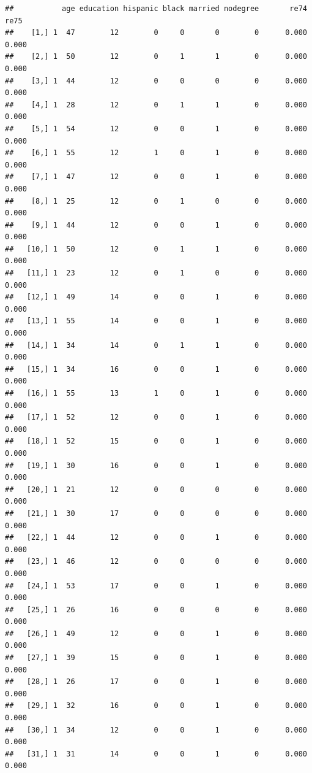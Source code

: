 \documentclass[
]{article}
\begin{document}
\begin{verbatim}
##           age education hispanic black married nodegree       re74       re75
##    [1,] 1  47        12        0     0       0        0      0.000      0.000
##    [2,] 1  50        12        0     1       1        0      0.000      0.000
##    [3,] 1  44        12        0     0       0        0      0.000      0.000
##    [4,] 1  28        12        0     1       1        0      0.000      0.000
##    [5,] 1  54        12        0     0       1        0      0.000      0.000
##    [6,] 1  55        12        1     0       1        0      0.000      0.000
##    [7,] 1  47        12        0     0       1        0      0.000      0.000
##    [8,] 1  25        12        0     1       0        0      0.000      0.000
##    [9,] 1  44        12        0     0       1        0      0.000      0.000
##   [10,] 1  50        12        0     1       1        0      0.000      0.000
##   [11,] 1  23        12        0     1       0        0      0.000      0.000
##   [12,] 1  49        14        0     0       1        0      0.000      0.000
##   [13,] 1  55        14        0     0       1        0      0.000      0.000
##   [14,] 1  34        14        0     1       1        0      0.000      0.000
##   [15,] 1  34        16        0     0       1        0      0.000      0.000
##   [16,] 1  55        13        1     0       1        0      0.000      0.000
##   [17,] 1  52        12        0     0       1        0      0.000      0.000
##   [18,] 1  52        15        0     0       1        0      0.000      0.000
##   [19,] 1  30        16        0     0       1        0      0.000      0.000
##   [20,] 1  21        12        0     0       0        0      0.000      0.000
##   [21,] 1  30        17        0     0       0        0      0.000      0.000
##   [22,] 1  44        12        0     0       1        0      0.000      0.000
##   [23,] 1  46        12        0     0       0        0      0.000      0.000
##   [24,] 1  53        17        0     0       1        0      0.000      0.000
##   [25,] 1  26        16        0     0       0        0      0.000      0.000
##   [26,] 1  49        12        0     0       1        0      0.000      0.000
##   [27,] 1  39        15        0     0       1        0      0.000      0.000
##   [28,] 1  26        17        0     0       1        0      0.000      0.000
##   [29,] 1  32        16        0     0       1        0      0.000      0.000
##   [30,] 1  34        12        0     0       1        0      0.000      0.000
##   [31,] 1  31        14        0     0       1        0      0.000      0.000

\end{verbatim}
\end{document}
